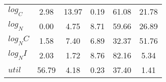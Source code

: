 \begin{center}
\begin{longtable}{lccccc}
$log_C         $	 & 	        2.98	 & 	       13.97	 & 	        0.19	 & 	       61.08	 & 	       21.78 \\ 
$log_N         $	 & 	        0.00	 & 	        4.75	 & 	        8.71	 & 	       59.66	 & 	       26.89 \\ 
$log_NC        $	 & 	        1.58	 & 	        7.40	 & 	        6.89	 & 	       32.37	 & 	       51.76 \\ 
$log_NI        $	 & 	        2.03	 & 	        1.72	 & 	        8.76	 & 	       82.16	 & 	        5.34 \\ 
$util          $	 & 	       56.79	 & 	        4.18	 & 	        0.23	 & 	       37.40	 & 	        1.41 \\ 
\end{longtable}
 \end{center}
